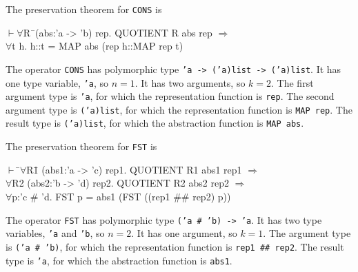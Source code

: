 \documentclass[envcountsame,runningheads]{llncs}
\begin{document}
\pagebreak[2]
The preservation theorem for {\tt CONS} is
{\tt \begin{tabbing}
\hspace{5.5mm}
    $\vdash \forall$R\=\ (abs:'a -> 'b) rep. QUOTIENT R abs rep $\Rightarrow$ \\
\>       $\forall$t h. h::t = MAP abs (rep h::MAP rep t)
\end{tabbing}}
The operator {\tt CONS} has polymorphic type {\tt 'a -> ('a)list -> ('a)list}. 
It has one type variable, {\tt 'a}, so $n = 1$. 
It has two arguments, so $k = 2$.
The first argument type is
{\tt 'a},
for which
the representation function
is {\tt rep}.
The second argument type is
{\tt ('a)list},
for which
the representation function
is {\tt MAP rep}.
The result type is
{\tt ('a)list},
for which
the abstraction function
is {\tt MAP abs}.

The preservation theorem for {\tt FST} is
{\tt \begin{tabbing}
\hspace{5.5mm}
    $\vdash$ \=$\forall$R\=1 (abs1:'a -> 'c) rep1. QUOTIENT R1 abs1 rep1 $\Rightarrow$ \\
\>     $\forall$R2 (abs2:'b -> 'd) rep2. QUOTIENT R2 abs2 rep2 $\Rightarrow$ \\
\>\>     $\forall$p:'c \# 'd. FST p = abs1 (FST ((rep1 \#\# rep2) p))
\end{tabbing}}
The operator {\tt FST} has polymorphic type {\tt ('a \# 'b) -> 'a}. 
It has two type variables, {\tt 'a} and {\tt 'b}, so $n = 2$. 
It has one argument, so $k = 1$.
The argument type is
{\tt ('a \# 'b)},
for which
the representation function
is {\tt rep1 \#\# rep2}.
The result type is
{\tt 'a},
for which
the abstraction function
is {\tt abs1}.
\end{document}
